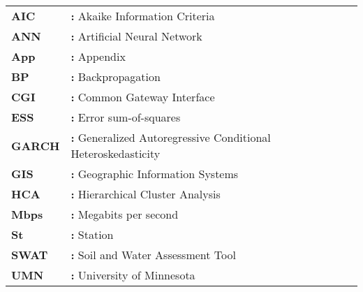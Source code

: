 \begin{tabular}{@{}p{2cm}l}
{\bf{AIC}} & {\bf:} Akaike Information Criteria\\
{\bf ANN} & {\bf:} Artificial Neural Network\\
{\bf App} & {\bf:} Appendix\\
{\bf BP} & {\bf:} Backpropagation\\
{\bf CGI} & {\bf:} Common Gateway Interface\\
{\bf ESS} & {\bf:} Error sum-of-squares\\
{\bf GARCH} & {\bf:} Generalized Autoregressive Conditional Heteroskedasticity\\
{\bf GIS} & {\bf:} Geographic Information Systems\\
{\bf HCA} & {\bf:} Hierarchical Cluster Analysis\\
{\bf Mbps} & {\bf:} Megabits per second\\
{\bf St} & {\bf:} Station\\
{\bf SWAT} & {\bf:} Soil and Water Assessment Tool\\
{\bf UMN} & {\bf:} University of Minnesota\\
\end{tabular}

